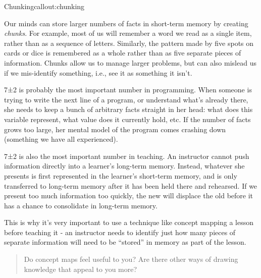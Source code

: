 \begin{callout}{Chunking}{callout:chunking}

Our minds can store larger numbers of facts in short-term memory by
creating \emph{chunks}. For example, most of us will remember a word we
read as a single item, rather than as a sequence of letters. Similarly,
the pattern made by five spots on cards or dice is remembered as a whole
rather than as five separate pieces of information. Chunks allow us to
manage larger problems, but can also mislead us if we mis-identify
something, i.e., see it as something it isn't.
\end{callout}

7±2 is probably the most important number in programming. When someone
is trying to write the next line of a program, or understand what's
already there, she needs to keep a bunch of arbitrary facts straight in
her head: what does this variable represent, what value does it
currently hold, etc. If the number of facts grows too large, her mental
model of the program comes crashing down (something we have all
experienced).

7±2 is also the most important number in teaching. An instructor cannot
push information directly into a learner's long-term memory. Instead,
whatever she presents is first represented in the learner's short-term
memory, and is only transferred to long-term memory after it has been
held there and rehearsed. If we present too much information too
quickly, the new will displace the old before it has a chance to
consolidate in long-term memory.

This is why it's very important to use a technique like concept mapping
a lesson before teaching it - an instructor needs to identify just how
many pieces of separate information will need to be ``stored'' in memory
as part of the lesson.

\begin{quote}
Do concept maps feel useful to you? Are there other ways of drawing
knowledge that appeal to you more?
\end{quote}
